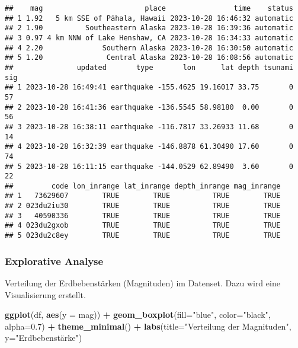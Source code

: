 \documentclass[
]{article}
\newenvironment{Shaded}{\begin{snugshade}}{\end{snugshade}}
\newcommand{\AttributeTok}[1]{\textcolor[rgb]{0.13,0.29,0.53}{#1}}
\newcommand{\FloatTok}[1]{\textcolor[rgb]{0.00,0.00,0.81}{#1}}
\newcommand{\FunctionTok}[1]{\textcolor[rgb]{0.13,0.29,0.53}{\textbf{#1}}}
\newcommand{\NormalTok}[1]{#1}
\newcommand{\SpecialCharTok}[1]{\textcolor[rgb]{0.81,0.36,0.00}{\textbf{#1}}}
\newcommand{\StringTok}[1]{\textcolor[rgb]{0.31,0.60,0.02}{#1}}
\begin{document}
\begin{verbatim}
##    mag                        place                time    status
## 1 1.92   5 km SSE of Pāhala, Hawaii 2023-10-28 16:46:32 automatic
## 2 1.90          Southeastern Alaska 2023-10-28 16:39:36 automatic
## 3 0.97 4 km NNW of Lake Henshaw, CA 2023-10-28 16:34:33 automatic
## 4 2.20              Southern Alaska 2023-10-28 16:30:50 automatic
## 5 1.20               Central Alaska 2023-10-28 16:08:56 automatic
##               updated       type       lon      lat depth tsunami sig
## 1 2023-10-28 16:49:41 earthquake -155.4625 19.16017 33.75       0  57
## 2 2023-10-28 16:41:36 earthquake -136.5545 58.98180  0.00       0  56
## 3 2023-10-28 16:38:11 earthquake -116.7817 33.26933 11.68       0  14
## 4 2023-10-28 16:32:39 earthquake -146.8878 61.30490 17.60       0  74
## 5 2023-10-28 16:11:15 earthquake -144.0529 62.89490  3.60       0  22
##         code lon_inrange lat_inrange depth_inrange mag_inrange
## 1   73629607        TRUE        TRUE          TRUE        TRUE
## 2 023du2iu30        TRUE        TRUE          TRUE        TRUE
## 3   40590336        TRUE        TRUE          TRUE        TRUE
## 4 023du2gxob        TRUE        TRUE          TRUE        TRUE
## 5 023du2c8ey        TRUE        TRUE          TRUE        TRUE
\end{verbatim}

\hypertarget{explorative-analyse}{%
\subsubsection{Explorative Analyse}\label{explorative-analyse}}

Verteilung der Erdbebenstärken (Magnituden) im Datenset. Dazu wird eine
Visualisierung erstellt.

\begin{Shaded}
\begin{Highlighting}[]
\FunctionTok{ggplot}\NormalTok{(df, }\FunctionTok{aes}\NormalTok{(}\AttributeTok{y =}\NormalTok{ mag)) }\SpecialCharTok{+}
  \FunctionTok{geom\_boxplot}\NormalTok{(}\AttributeTok{fill=}\StringTok{"blue"}\NormalTok{, }\AttributeTok{color=}\StringTok{"black"}\NormalTok{, }\AttributeTok{alpha=}\FloatTok{0.7}\NormalTok{) }\SpecialCharTok{+}
  \FunctionTok{theme\_minimal}\NormalTok{() }\SpecialCharTok{+}
  \FunctionTok{labs}\NormalTok{(}\AttributeTok{title=}\StringTok{"Verteilung der Magnituden"}\NormalTok{, }\AttributeTok{y=}\StringTok{"Erdbebenstärke"}\NormalTok{) }
\end{Highlighting}
\end{Shaded}
\end{document}
